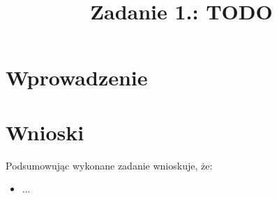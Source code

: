 \documentclass{classrep}
\author{%
    \studentinfo[216806@edu.p.lodz.pl]{Kamil Kowalewski TODO}{216806}
}
\title{Zadanie 1.: TODO}
\begin{document}
    \maketitle
    \thispagestyle{fancyplain}

    \section{Wprowadzenie} {
        \cite{first_item}
    }

    \section{} {

    }

    \section{Wnioski} {
        Podsumowując wykonane zadanie wnioskuje, że:
        \begin{itemize}
            \item ...

        \end{itemize}
    }

    \begin{thebibliography}{0}
    \end{thebibliography}
\end{document}
